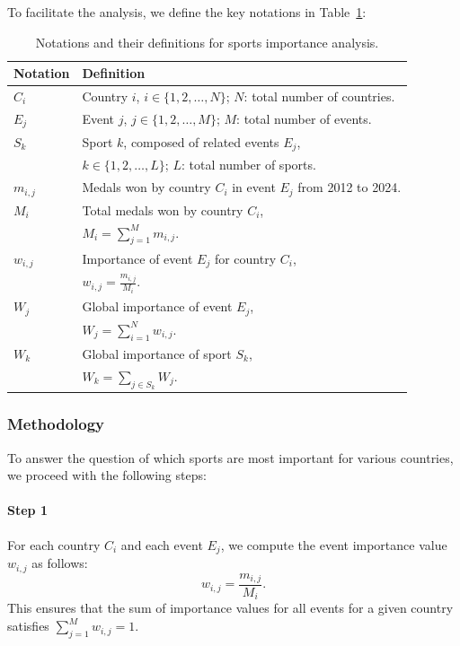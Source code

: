 \documentclass{mcmthesis}
\begin{document}
To facilitate the analysis, we define the key notations in Table~\ref{tab:notations}:


\begin{table}[h!]
    \centering
    \begin{tabular}{@{}ll@{}}
        \toprule
        \textbf{Notation} & \textbf{Definition} \\ 
        \midrule
        $C_i$ & Country $i$, $i \in \{1, 2, \ldots, N\}$; $N$: total number of countries. \\
        $E_j$ & Event $j$, $j \in \{1, 2, \ldots, M\}$; $M$: total number of events. \\
        $S_k$ & Sport $k$, composed of related events $E_j$, \\
             & $k \in \{1, 2, \ldots, L\}$; $L$: total number of sports. \\
        $m_{i,j}$ & Medals won by country $C_i$ in event $E_j$ from 2012 to 2024. \\
        $M_i$ & Total medals won by country $C_i$, \\
             & $M_i = \sum_{j=1}^M m_{i,j}.$ \\
        $w_{i,j}$ & Importance of event $E_j$ for country $C_i$, \\
             & $w_{i,j} = \frac{m_{i,j}}{M_i}.$ \\
        $W_j$ & Global importance of event $E_j$, \\
             & $W_j = \sum_{i=1}^N w_{i,j}.$ \\
        $W_k$ & Global importance of sport $S_k$, \\
             & $W_k = \sum_{j \in S_k} W_j.$ \\
        \bottomrule
    \end{tabular}
    \caption{Notations and their definitions for sports importance analysis.}
    \label{tab:notations}
\end{table}

\subsubsection{Methodology}
To answer the question of which sports are most important for various countries, we proceed with the following steps:

\paragraph{Step 1}

For each country $C_i$ and each event $E_j$, we compute the event importance value $w_{i,j}$ as follows:
\[
w_{i,j} = \frac{m_{i,j}}{M_i}.
\]
This ensures that the sum of importance values for all events for a given country satisfies $\sum_{j=1}^M w_{i,j} = 1$.
\end{document}
